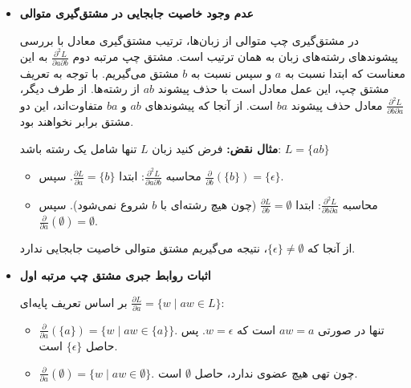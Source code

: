 \documentclass[../HW.tex]{subfiles}
\begin{document}
    \begin{itemize}

        \item[\textbf{الف)}] \textbf{عدم وجود خاصیت جابجایی در مشتق‌گیری متوالی}

              در مشتق‌گیری چپ متوالی از زبان‌ها، ترتیب مشتق‌گیری معادل با بررسی پیشوندهای رشته‌های زبان به همان ترتیب است. مشتق چپ مرتبه دوم $\frac{\partial^2 L}{\partial a \partial b}$ به این معناست که ابتدا نسبت به $a$ و سپس نسبت به $b$ مشتق می‌گیریم. با توجه به تعریف مشتق چپ، این عمل معادل است با حذف پیشوند $ab$ از رشته‌ها. از طرف دیگر، $\frac{\partial^2 L}{\partial b \partial a}$ معادل حذف پیشوند $ba$ است. از آنجا که پیشوندهای $ab$ و $ba$ متفاوت‌اند، این دو مشتق برابر نخواهند بود.

              \textbf{مثال نقض:}
              فرض کنید زبان $L$ تنها شامل یک رشته باشد: $L = \{ab\}$
              \begin{itemize}
                  \item محاسبه $\frac{\partial^2 L}{\partial a \partial b}$:
                        ابتدا $\frac{\partial L}{\partial a} = \{b\}$. سپس $\frac{\partial}{\partial b}(\{b\}) = \{\epsilon\}$.
                  \item محاسبه $\frac{\partial^2 L}{\partial b \partial a}$:
                        ابتدا $\frac{\partial L}{\partial b} = \emptyset$ (چون هیچ رشته‌ای با $b$ شروع نمی‌شود). سپس $\frac{\partial}{\partial a}(\emptyset) = \emptyset$.
              \end{itemize}
              از آنجا که $\{\epsilon\} \neq \emptyset$، نتیجه می‌گیریم مشتق متوالی خاصیت جابجایی ندارد.

              \vspace{0.5cm}

        \item[\textbf{ب)}] \textbf{اثبات روابط جبری مشتق چپ مرتبه اول}

              بر اساس تعریف پایه‌ای $ \frac{\partial L}{\partial a} = \{ w \mid aw \in L \} $:

              \begin{itemize}
                  \item $\frac{\partial}{\partial a}(\{a\}) = \{ w \mid aw \in \{a\} \}$. تنها در صورتی $aw = a$ است که $w = \epsilon$. پس حاصل $\{\epsilon\}$ است.

                  \item $\frac{\partial}{\partial a}(\emptyset) = \{ w \mid aw \in \emptyset \}$. چون تهی هیچ عضوی ندارد، حاصل $\emptyset$ است.


\end{itemize}
\end{itemize}
\end{document}

